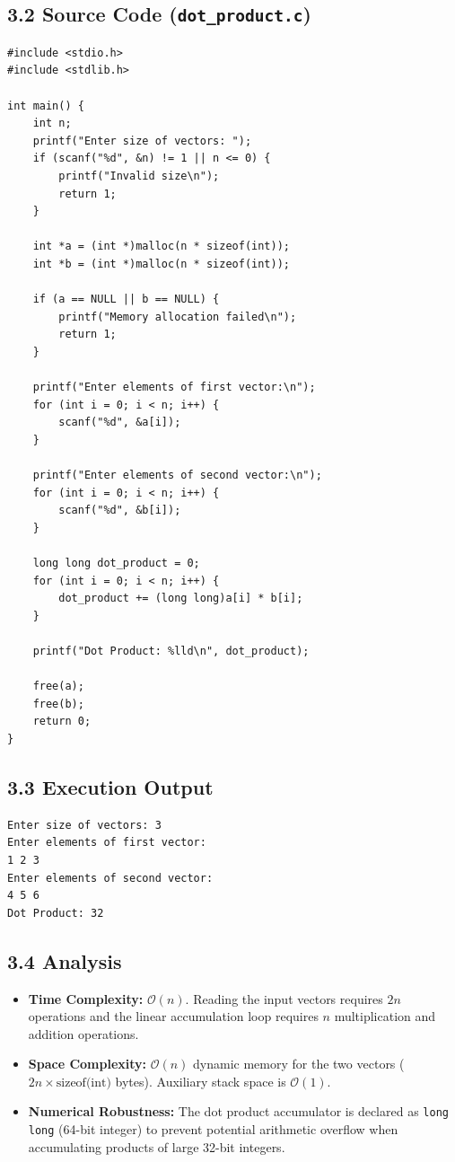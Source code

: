 \documentclass[12pt]{article}
\begin{document}
\subsection*{3.2 Source Code (\texttt{dot\_product.c})}
\begin{lstlisting}[style=code]
#include <stdio.h>
#include <stdlib.h>

int main() {
    int n;
    printf("Enter size of vectors: ");
    if (scanf("%d", &n) != 1 || n <= 0) {
        printf("Invalid size\n");
        return 1;
    }

    int *a = (int *)malloc(n * sizeof(int));
    int *b = (int *)malloc(n * sizeof(int));

    if (a == NULL || b == NULL) {
        printf("Memory allocation failed\n");
        return 1;
    }

    printf("Enter elements of first vector:\n");
    for (int i = 0; i < n; i++) {
        scanf("%d", &a[i]);
    }

    printf("Enter elements of second vector:\n");
    for (int i = 0; i < n; i++) {
        scanf("%d", &b[i]);
    }

    long long dot_product = 0;
    for (int i = 0; i < n; i++) {
        dot_product += (long long)a[i] * b[i];
    }

    printf("Dot Product: %lld\n", dot_product);

    free(a);
    free(b);
    return 0;
}
\end{lstlisting}

\subsection*{3.3 Execution Output}
\begin{lstlisting}[style=output]
Enter size of vectors: 3
Enter elements of first vector:
1 2 3
Enter elements of second vector:
4 5 6
Dot Product: 32
\end{lstlisting}

\subsection*{3.4 Analysis}
\begin{itemize}
    \item \textbf{Time Complexity:} $\mathcal{O}(n)$. Reading the input vectors requires $2n$ operations and the linear accumulation loop requires $n$ multiplication and addition operations.
    \item \textbf{Space Complexity:} $\mathcal{O}(n)$ dynamic memory for the two vectors ($2n \times \text{sizeof(int)}$ bytes). Auxiliary stack space is $\mathcal{O}(1)$.
    \item \textbf{Numerical Robustness:} The dot product accumulator is declared as \texttt{long long} (64-bit integer) to prevent potential arithmetic overflow when accumulating products of large 32-bit integers.
\end{itemize}
\end{document}
